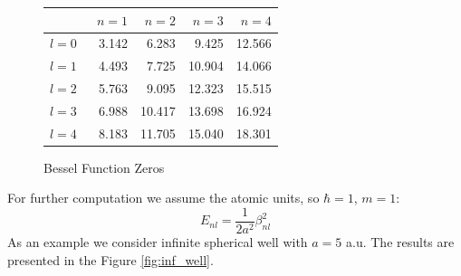\documentclass[a4paper, 12pt]{article}
\begin{document}
\begin{figure}[h!]
\centering
\begin{tabular}{lrrrr}
\toprule
{} &  \ $n=1$ &   $n=2$ &   $n=3$ &   $n=4$ \\
\midrule
$l=0$ &  3.142 &   6.283 &   9.425 &  12.566 \\
$l=1$ &  4.493 &   7.725 &  10.904 &  14.066 \\
$l=2$ &  5.763 &   9.095 &  12.323 &  15.515 \\
$l=3$ &  6.988 &  10.417 &  13.698 &  16.924 \\
$l=4$ &  8.183 &  11.705 &  15.040 &  18.301 \\
\bottomrule
\end{tabular}
\caption{Bessel Function Zeros}
\label{bess_0}
\end{figure}
For further computation we assume the atomic units, so $\hbar =  1$, $m=  1$:
$$E_{nl} = \frac{1}{2a^2}\beta_{nl}^2$$
As an example we consider infinite spherical well with $a= 5$ a.u.
The results are presented in the Figure \ref{fig:inf_well}.
\end{document}

